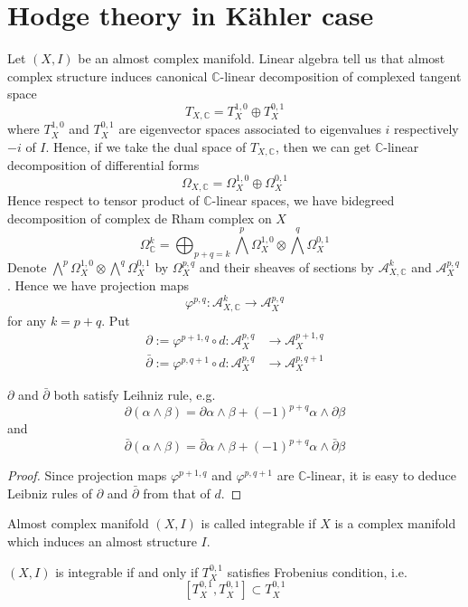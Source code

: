 \documentclass{amsart}
\begin{document}
\section{Hodge theory in K\"ahler case}
Let $(X,I)$ be an almost complex manifold. Linear algebra tell us that almost complex structure induces canonical $\mathbb{C}$-linear decomposition of complexed tangent space
\[
T_{X,\mathbb{C}}= T_{X}^{1,0} \oplus T_X^{0,1}
\]
where $T_X^{1,0}$ and $T_X^{0,1}$ are eigenvector spaces associated to eigenvalues $i$ respectively $-i$ of $I$. Hence, if we take the dual space of $T_{X,\mathbb{C}}$, then we can get $\mathbb{C}$-linear decomposition of differential forms
\[
\Omega_{X,\mathbb{C}} = \Omega_X^{1,0} \oplus \Omega_X^{0,1}
\]
Hence respect to tensor product of $\mathbb{C}$-linear spaces, we have bidegreed decomposition of complex de Rham complex on $X$
\[
\Omega^k_{\mathbb{C}} = \bigoplus_{p+q=k}\bigwedge^p \Omega_X^{1,0} \otimes \bigwedge^q \Omega_X^{0,1}
\]
Denote $\bigwedge^p \Omega_X^{1,0} \otimes \bigwedge^q \Omega_X^{0,1}$ by $\Omega^{p,q}_X$ and their sheaves of sections by $\mathcal{A}^k_{X,\mathbb{C}}$ and $\mathcal{A}^{p,q}_{X}$. Hence we have projection maps
\[
\varphi^{p,q}: \mathcal{A}^{k}_{X,\mathbb{C}} \rightarrow \mathcal{A}^{p,q}_X
\]
for any $k= p+q$. Put 
\[
\begin{aligned}
\partial:= \varphi^{p+1,q} \circ d : \mathcal{A}^{p,q}_{X} &\rightarrow \mathcal{A}^{p+1,q}_{X}  \\
\bar{\partial}:= \varphi^{p,q+1} \circ d: \mathcal{A}^{p,q}_X &\rightarrow \mathcal{A}^{p,q+1}_X
\end{aligned}
\]
\begin{seclemma}
	$\partial$ and $\bar{\partial}$ both satisfy Leihniz rule, e.g.
	\[
	\partial(\alpha \wedge \beta) = \partial{\alpha} \wedge \beta +(-1)^{p+q} \alpha \wedge \partial{\beta}
	\]
	and
	\[
	\bar{\partial}(\alpha \wedge \beta) = \bar{\partial}\alpha \wedge \beta + (-1)^{p+q}\alpha \wedge \bar{\partial} \beta
	\]
\end{seclemma}
\begin{proof}
	Since projection maps $\varphi^{p+1,q}$ and $\varphi^{p,q+1}$ are $\mathbb{C}$-linear, it is easy to deduce Leibniz rules of $\partial$ and $\bar{\partial}$ from that of $d$.
\end{proof}
\begin{secdefn}
	Almost complex manifold $(X,I)$ is called integrable if $X$ is a complex manifold which induces an almost structure $I$.
\end{secdefn}
\begin{secthm}
	$(X,I)$ is integrable if and only if $T_X^{0,1}$ satisfies Frobenius condition, i.e.
	\[
	[T_X^{0,1}, T_X^{0,1}] \subset T_X^{0,1}
	\]
\end{secthm}
\end{document}
